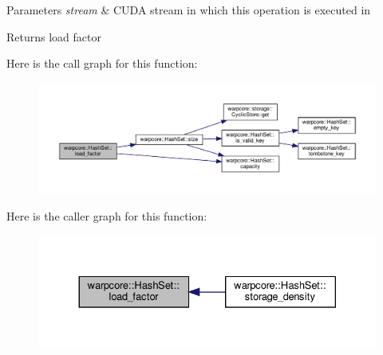 \begin{DoxyParams}{Parameters}
{\em stream} & C\+U\+DA stream in which this operation is executed in \\
\hline
\end{DoxyParams}
\begin{DoxyReturn}{Returns}
load factor 
\end{DoxyReturn}
Here is the call graph for this function\+:
\nopagebreak
\begin{figure}[H]
\begin{center}
\leavevmode
\includegraphics[width=350pt]{classwarpcore_1_1HashSet_a7ad4ad097ae0e332c4f24d867e6c411f_cgraph}
\end{center}
\end{figure}
Here is the caller graph for this function\+:
\nopagebreak
\begin{figure}[H]
\begin{center}
\leavevmode
\includegraphics[width=330pt]{classwarpcore_1_1HashSet_a7ad4ad097ae0e332c4f24d867e6c411f_icgraph}
\end{center}
\end{figure}
\mbox{\label{classwarpcore_1_1HashSet_a15b81a16c6fbdb88dee1fd8c05a9fdbd}} 
